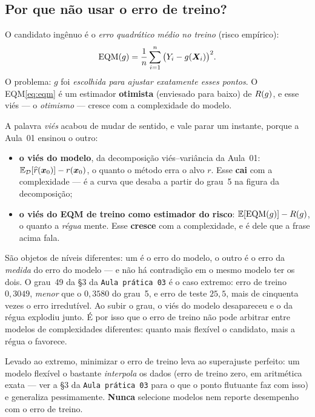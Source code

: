 \documentclass[11pt,a4paper]{article}
\begin{document}
\subsection{Por que não usar o erro de treino?}
O candidato ingênuo é o \emph{erro quadrático médio no treino} (risco empírico):
\begin{equation}\label{eq:eqm}
  \mathrm{EQM}(g) = \frac1n \sum_{i=1}^n \big(Y_i - g(\bm{X}_i)\big)^2 .
\end{equation}
O problema: $g$ foi \emph{escolhida para ajustar exatamente esses pontos}. O
EQM\eqref{eq:eqm} é um estimador \textbf{otimista} (enviesado para baixo) de
$R(g)$, e esse viés --- o \emph{otimismo} --- cresce com a complexidade do
modelo.

\begin{atencao}
A palavra \emph{viés} acabou de mudar de sentido, e vale parar um instante, porque
a Aula~01 ensinou o outro:
\begin{itemize}[leftmargin=1.4cm,nosep]
  \item \textbf{o viés do modelo}, da decomposição viés--variância da Aula~01:
        $\mathbb{E}_{\mathcal{D}}[\widehat{r}(\bm{x}_0)]-r(\bm{x}_0)$, o quanto o método erra o alvo $r$. Esse
        \textbf{cai} com a complexidade --- é a curva que desaba a partir do
        grau~5 na figura da decomposição;
  \item \textbf{o viés do EQM de treino como estimador do risco}:
        $\mathbb{E}[\mathrm{EQM}(g)]-R(g)$, o quanto a \emph{régua} mente. Esse
        \textbf{cresce} com a complexidade, e é dele que a frase acima fala.
\end{itemize}
São objetos de níveis diferentes: um é o erro do modelo, o outro é o erro da
\emph{medida} do erro do modelo --- e não há contradição em o mesmo modelo ter os
dois. O grau~49 da §3 da \texttt{Aula prática 03} é o caso extremo: erro de treino
$0{,}3049$, \emph{menor} que o $0{,}3580$ do grau~5, e erro de teste $25{,}5$, mais de
cinquenta vezes o erro irredutível.
Ao subir o grau, o viés do modelo desapareceu e o da régua explodiu junto. É por
isso que o erro de treino não pode arbitrar entre modelos de complexidades
diferentes: quanto mais flexível o candidato, mais a régua o favorece.
\end{atencao}

\begin{atencao}
Levado ao extremo, minimizar o erro de treino leva ao superajuste perfeito: um
modelo flexível o bastante \emph{interpola} os dados (erro de treino zero, em
aritmética exata --- ver a §3 da \texttt{Aula prática 03} para o que o ponto
flutuante faz com isso) e generaliza pessimamente. \textbf{Nunca} selecione
modelos nem reporte desempenho com o erro de treino.
\end{atencao}
\end{document}
